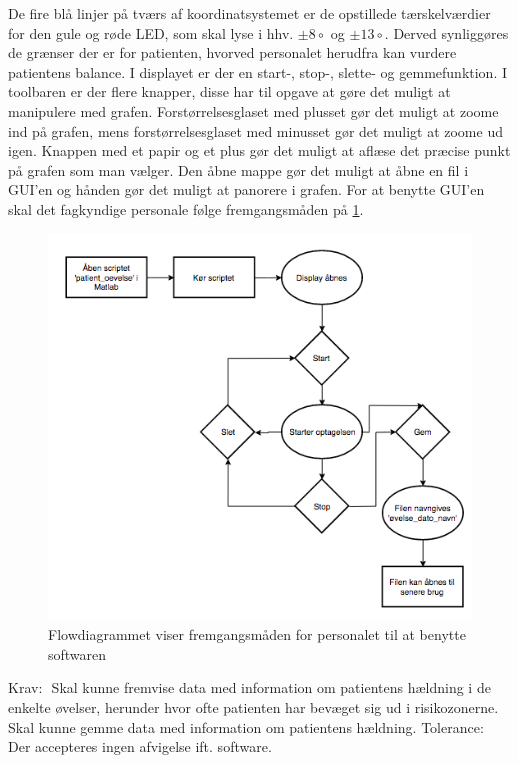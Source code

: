 De fire blå linjer på tværs af koordinatsystemet er de opstillede tærskelværdier for den gule og røde LED, som skal lyse i hhv. $\pm 8\circ$ og $\pm 13\circ$. Derved synliggøres de grænser der er for patienten, hvorved personalet herudfra kan vurdere patientens balance. I displayet er der en start-, stop-, slette- og gemmefunktion.
I toolbaren er der flere knapper, disse har til opgave at gøre det muligt at manipulere med grafen. Forstørrelsesglaset med plusset gør det muligt at zoome ind på grafen, mens forstørrelsesglaset med minusset gør det muligt at zoome ud igen. Knappen med et papir og et plus gør det muligt at aflæse det præcise punkt på grafen som man vælger. Den åbne mappe gør det muligt at åbne en fil i GUI'en og hånden gør det muligt at panorere i grafen.
For at benytte GUI'en skal det fagkyndige personale følge fremgangsmåden på \ref{Fig:fremgangsmåde_software}.
\begin{figure}[H] 
	\centering 
	\includegraphics[scale=0.5]{figures/cProblemloesning/Software_flowdiagram.PNG}
	\caption{Flowdiagrammet viser fremgangsmåden for personalet til at benytte softwaren}
	\label{Fig:fremgangsmåde_software}
\end{figure}


Krav:
 Skal kunne fremvise data med information om patientens hældning i de enkelte øvelser,
herunder hvor ofte patienten har bevæget sig ud i risikozonerne.
 Skal kunne gemme data med information om patientens hældning.
Tolerance:
 Der accepteres ingen afvigelse ift. software.

